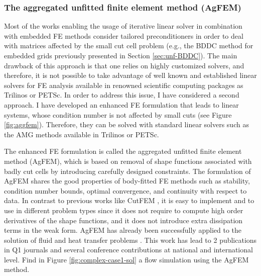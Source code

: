\documentclass{article}
\newcommand{\bemph}[1]{#1}
\begin{document}
\subsubsection{The aggregated unfitted finite element method (AgFEM)}

Most of the works enabling the usage of iterative linear solver in combination with embedded FE methods consider tailored preconditioners in order to deal with matrices affected by the small cut cell problem (e.g., the BDDC method for embedded grids previously presented in Section \ref{sec:unf-BDDC}). The main drawback of this approach is that one relies on highly customized solvers, and therefore, it is not possible to take advantage of well known and established linear solvers for FE analysis available in renowned scientific computing packages as Trilinos or PETSc. In order to address this issue, I have considered a second approach. \bemph{I have developed an enhanced FE formulation that leads to linear systems, whose condition number is not affected by small cuts} (see Figure \ref{fig:aggfem}). Therefore, they can be solved with standard linear solvers such as the AMG methods available in Trilinos or PETSc.

The enhanced FE formulation is called the aggregated unfitted finite element method (AgFEM), which is based on removal of shape functions associated with badly cut cells by introducing carefully designed constraints.  The formulation of AgFEM shares the good properties of body-fitted FE methods such as stability, condition number bounds, optimal convergence, and continuity with respect to data.  In contrast to previous works like CutFEM \cite{burman_2015}, it is easy to implement and to use in different problem types since it does not require to compute high order derivatives of the shape functions, and it does not introduce extra dissipation terms in the weak form.  AgFEM has already been successfully applied to the solution of fluid \cite{badia_2018b} and heat transfer problems \cite{badia_2018a}. This work has lead to {{2 publications in Q1 journals}} and several conference contributions at national and international level. Find in Figure \ref{fig:complex-case1-sol} a flow simulation using the AgFEM method.
\end{document}
